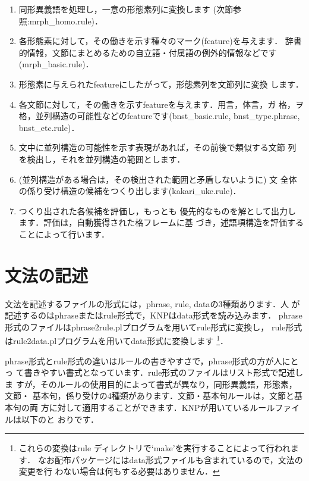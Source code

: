 \documentclass[a4j,11pt,titlepage]{jarticle}
\begin{document}
\begin{enumerate}
\item 同形異義語を処理し，一意の形態素列に変換します
  (次節参照:mrph\_homo.rule)．
\item 各形態素に対して，その働きを示す種々のマーク(feature)を与えます．
  辞書的情報，文節にまとめるための自立語・付属語の例外的情報などです
  (mrph\_basic.rule)．
\item 形態素に与えられたfeatureにしたがって，形態素列を文節列に変換
  します．
\item 各文節に対して，その働きを示すfeatureを与えます．用言，体言，ガ
  格，ヲ格，並列構造の可能性などのfeatureです(bnst\_basic.rule, 
  bnst\_type.phrase, bnst\_etc.rule)．
\item 文中に並列構造の可能性を示す表現があれば，その前後で類似する文節
  列を検出し，それを並列構造の範囲とします．
\item (並列構造がある場合は，その検出された範囲と矛盾しないように) 文
  全体の係り受け構造の候補をつくり出します(kakari\_uke.rule)．
\item つくり出された各候補を評価し，もっとも
  優先的なものを解として出力します．評価は，自動獲得された格フレームに基
  づき，述語項構造を評価することによって行います．
\end{enumerate}


\section{文法の記述}

文法を記述するファイルの形式には，phrase, rule, dataの3種類あります．人
が記述するのはphraseまたはrule形式で，KNPはdata形式を読み込みます．
phrase形式のファイルはphrase2rule.plプログラムを用いてrule形式に変換し，
rule形式はrule2data.plプログラムを用いてdata形式に変換します
\footnote{
これらの変換はrule ディレクトリで`make'を実行することによって行われます．
なお配布パッケージにはdata形式ファイルも含まれているので，文法の変更を行
わない場合は何もする必要はありません．}．

phrase形式とrule形式の違いはルールの書きやすさで，phrase形式の方が人にとっ
て書きやすい書式となっています．rule形式のファイルはリスト形式で記述しま
すが，そのルールの使用目的によって書式が異なり，同形異義語，形態素，文節・
基本句，係り受けの4種類があります．文節・基本句ルールは，文節と基本句の両
方に対して適用することができます．KNPが用いているルールファイルは以下のと
おりです．
\end{document}
